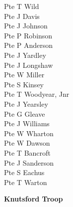 \begin{multicols}{3}
  Pte T Wild \\
  Pte J Davis \\
  Pte J Johnson \\
  Pte P Robinson \\
  Pte P Anderson \\
  Pte J Yardley \\
  Pte J Longshaw \\
  Pte W Miller \\
  Pte S Kinsey \\
  Pte T Woodyear, Jnr \\
  Pte J Yearsley \\
  Pte G Gleave \\
  Pte J Williams \\
  Pte W Wharton \\
  Pte W Dawson \\
  Pte T Bancroft \\
  Pte J Sanderson \\
  Pte S Eachus \\
  Pte T Warton \\
\end{multicols}

\pagebreak

\begin{center}
  \Large
  \textbf{Knutsford Troop}
\end{center}

